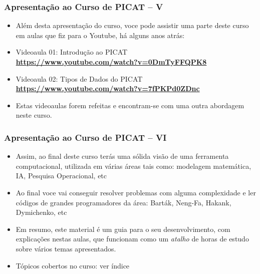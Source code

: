     
\begin{frame}[fragile]
  \frametitle{Apresentação ao Curso de PICAT -- V}
  \begin{itemize}

    \item Além desta  apresentação do curso, voce pode assistir uma
    parte deste curso em aulas que fiz para o Youtube, há alguns anos atrás:

    \pause
    \item Videoaula 01: Introdução ao PICAT\\
    \textbf{\url {https://www.youtube.com/watch?v=0DmTyFFQPK8}}

    \pause 
    \item Videoaula 02: Tipos de Dados do PICAT\\
    \textbf{\url {https://www.youtube.com/watch?v=7fPKPd0ZDnc}} 
    
    \item Estas videoaulas forem refeitas e  encontram-se com uma outra abordagem
    neste curso.
    
  \end{itemize}

\end{frame}




\begin{frame}[fragile]
  \frametitle{Apresentação ao Curso de PICAT -- VI}
  \begin{itemize}

						
    \item Assim, ao final deste curso terás uma sólida visão  de uma ferramenta
    computacional, utilizada em várias áreas tais como: modelagem matemática, IA,
    Pesquisa Operacional, etc

    \pause
    \item Ao final voce vai conseguir resolver problemas com alguma complexidade e ler
    códigos de grandes programadores da área: Barták, Neng-Fa, Hakank, Dymichenko, etc    
    
    \pause
		\item Em resumo, este material é  um guia para o seu desenvolvimento,
		 com explicações nestas aulas, que funcionam como um \textit{atalho} de
		 horas de estudo sobre vários temas apresentados.
   
    \pause
    \item Tópicos   cobertos no curso: ver índice
  \end{itemize}

\end{frame}
